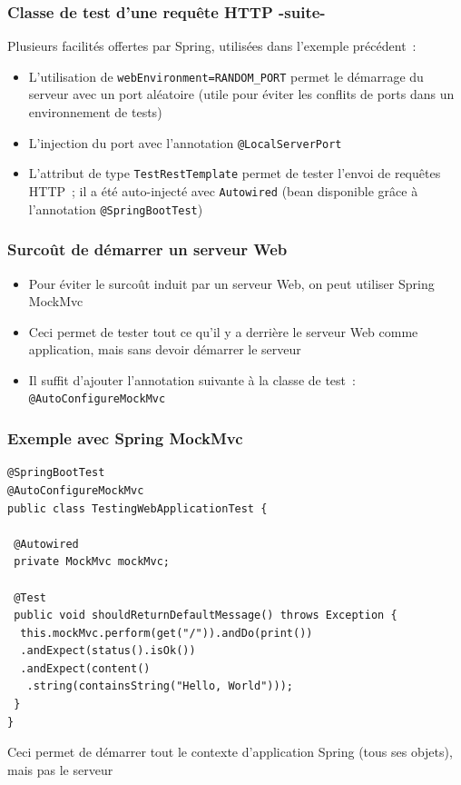 \documentclass{beamer}
\begin{document}
\begin{frame}[fragile]
	\frametitle{Classe de test d'une requête HTTP -suite-}
	Plusieurs facilités offertes par Spring, utilisées dans l'exemple précédent~:
	\begin{itemize}
		\item L'utilisation de \texttt{webEnvironment=RANDOM\_PORT} permet le démarrage du serveur avec un port aléatoire (utile pour éviter les conflits de ports dans un environnement de tests)
		\item L'injection du port avec l'annotation \texttt{@LocalServerPort}
		\item L'attribut de type \texttt{TestRestTemplate} permet de tester l'envoi de requêtes HTTP~; il a été auto-injecté avec \texttt{Autowired} (bean disponible grâce à l'annotation \texttt{@SpringBootTest})
	\end{itemize}
\end{frame}

\begin{frame}
	\frametitle{Surcoût de démarrer un serveur Web}
	\begin{itemize}
		\item Pour éviter le surcoût induit par un serveur Web, on peut utiliser Spring MockMvc
		\item Ceci permet de tester tout ce qu'il y a derrière le serveur Web comme application, mais sans devoir démarrer le serveur
		\item Il suffit d'ajouter l'annotation suivante à la classe de test~: \texttt{@AutoConfigureMockMvc}
	\end{itemize}
\end{frame}

\begin{frame}[fragile]
	\frametitle{Exemple avec Spring MockMvc}
\begin{lstlisting}
@SpringBootTest
@AutoConfigureMockMvc
public class TestingWebApplicationTest {
	
 @Autowired
 private MockMvc mockMvc;

 @Test
 public void shouldReturnDefaultMessage() throws Exception {
  this.mockMvc.perform(get("/")).andDo(print())
  .andExpect(status().isOk())
  .andExpect(content()
   .string(containsString("Hello, World")));
 }
}
\end{lstlisting}
Ceci permet de démarrer tout le contexte d'application Spring (tous ses objets), mais pas le serveur
\end{frame}
\end{document}
